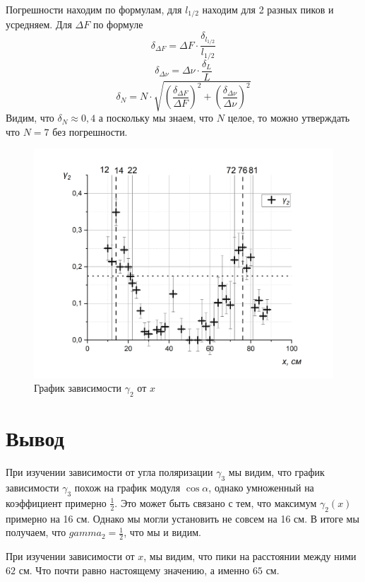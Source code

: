 \documentclass[a4paper, 12pt]{article}%
\begin{document}
\begin{enumerate}
Погрешности находим по формулам, для $l_{1/2}$ находим для 2 разных пиков и усредняем. Для $\Delta F$ по формуле 
\[\delta_{\Delta F} = \Delta F \cdot \frac{\delta_{l_{1/2}}}{l_{1/2}}\]
\[\delta_{\Delta \nu} = \Delta \nu \cdot \frac{\delta_L}{L}\]
\[\delta_N = N \cdot \sqrt{\left( \frac{\delta_{\Delta F}}{\Delta F}\right)^2 + \left( \frac{\delta_{\Delta \nu}}{\Delta \nu}\right)^2}\]
Видим, что $\delta_N \approx 0,4$ а поскольку мы знаем, что $N$ целое, то можно утверждать что $N = 7$ без погрешности. 
\begin{figure}[h]
\begin{center}
\includegraphics[width = \textwidth]{6.jpg}
\caption{График зависимости $\gamma_2$ от $x$}
\end{center}
\end{figure}
\end{enumerate}
\newpage
\section*{Вывод}
При изучении зависимости от угла поляризации $\gamma_3$ мы видим, что график зависимости $\gamma_3$ похож на график модуля $\cos \alpha$, однако умноженный на коэффициент примерно $\frac{1}{2}$. Это может быть связано с тем, что максимум $\gamma_2(x)$ примерно на 16 см. Однако мы могли установить не совсем на 16 см. В итоге мы получаем, что $gamma_2 = \frac{1}{2}$, что мы и видим.

При изучении зависимости от $x$, мы видим, что пики на расстоянии между ними $62$ см. Что почти равно настоящему значению, а именно $65$ см.
\end{document}
